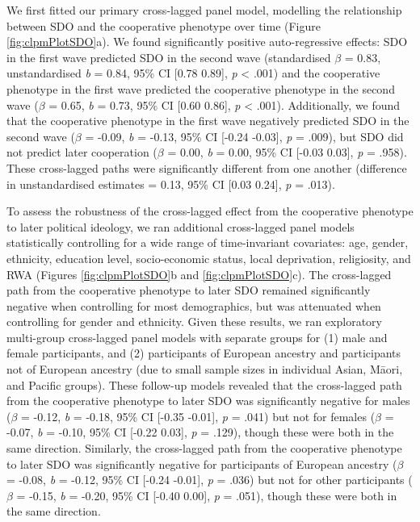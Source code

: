 \documentclass[
  man,floatsintext]{apa6}
\begin{document}
We first fitted our primary cross-lagged panel model, modelling the relationship between SDO and the cooperative phenotype over time (Figure \ref{fig:clpmPlotSDO}a). We found significantly positive auto-regressive effects: SDO in the first wave predicted SDO in the second wave (standardised \(\beta\) = 0.83, unstandardised \emph{b} = 0.84, 95\% CI {[}0.78 0.89{]}, \emph{p} \textless{} .001) and the cooperative phenotype in the first wave predicted the cooperative phenotype in the second wave (\(\beta\) = 0.65, \emph{b} = 0.73, 95\% CI {[}0.60 0.86{]}, \emph{p} \textless{} .001). Additionally, we found that the cooperative phenotype in the first wave negatively predicted SDO in the second wave (\(\beta\) = -0.09, \emph{b} = -0.13, 95\% CI {[}-0.24 -0.03{]}, \emph{p} = .009), but SDO did not predict later cooperation (\(\beta\) = 0.00, \emph{b} = 0.00, 95\% CI {[}-0.03 0.03{]}, \emph{p} = .958). These cross-lagged paths were significantly different from one another (difference in unstandardised estimates = 0.13, 95\% CI {[}0.03 0.24{]}, \emph{p} = .013).

To assess the robustness of the cross-lagged effect from the cooperative phenotype to later political ideology, we ran additional cross-lagged panel models statistically controlling for a wide range of time-invariant covariates: age, gender, ethnicity, education level, socio-economic status, local deprivation, religiosity, and RWA (Figures \ref{fig:clpmPlotSDO}b and \ref{fig:clpmPlotSDO}c). The cross-lagged path from the cooperative phenotype to later SDO remained significantly negative when controlling for most demographics, but was attenuated when controlling for gender and ethnicity. Given these results, we ran exploratory multi-group cross-lagged panel models with separate groups for (1) male and female participants, and (2) participants of European ancestry and participants not of European ancestry (due to small sample sizes in individual Asian, Māori, and Pacific groups). These follow-up models revealed that the cross-lagged path from the cooperative phenotype to later SDO was significantly negative for males (\(\beta\) = -0.12, \emph{b} = -0.18, 95\% CI {[}-0.35 -0.01{]}, \emph{p} = .041) but not for females (\(\beta\) = -0.07, \emph{b} = -0.10, 95\% CI {[}-0.22 0.03{]}, \emph{p} = .129), though these were both in the same direction. Similarly, the cross-lagged path from the cooperative phenotype to later SDO was significantly negative for participants of European ancestry (\(\beta\) = -0.08, \emph{b} = -0.12, 95\% CI {[}-0.24 -0.01{]}, \emph{p} = .036) but not for other participants (\(\beta\) = -0.15, \emph{b} = -0.20, 95\% CI {[}-0.40 0.00{]}, \emph{p} = .051), though these were both in the same direction.
\end{document}
